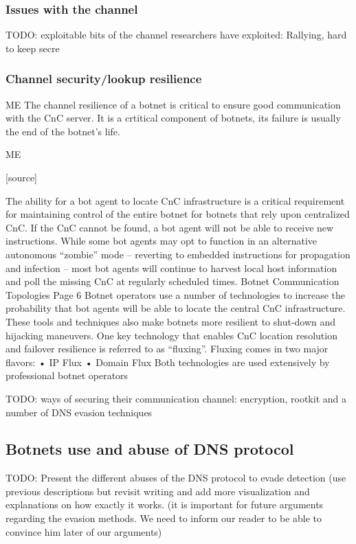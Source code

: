 \subsubsection{Issues with the channel}
TODO: exploitable bits of the channel researchers have exploited: Rallying, hard to keep secre

\subsubsection{Channel security/lookup resilience}
ME
The channel resilience of a botnet is critical to ensure good communication with the CnC server. It is a crtitical component of botnets, its failure is usually the end of the botnet's life. 



ME


[source]

The ability for a bot agent to locate CnC infrastructure is a critical requirement for
maintaining control of the entire botnet for botnets that rely upon centralized CnC. If
the CnC cannot be found, a bot agent will not be able to receive new instructions.
While some bot agents may opt to function in an alternative autonomous “zombie”
mode – reverting to embedded instructions for propagation and infection – most bot
agents will continue to harvest local host information and poll the missing CnC at
regularly scheduled times.
Botnet Communication Topologies
Page 6
Botnet operators use a number of technologies to increase the probability that bot
agents will be able to locate the central CnC infrastructure. These tools and techniques
also make botnets more resilient to shut-down and hijacking maneuvers.
One key technology that enables CnC location resolution and failover resilience is
referred to as “fluxing”. Fluxing comes in two major flavors:
• IP Flux
• Domain Flux
Both technologies are used extensively by professional botnet operators


TODO: ways of securing their communication channel: encryption, rootkit and a number of DNS evasion techniques
\subsection{Botnets use and abuse of DNS protocol}
TODO: Present the different abuses of the DNS protocol to evade detection
(use previous descriptions but revisit writing and add more visualization and explanations on how exactly it works. (it is important for future arguments regarding the evasion methods. We need to inform our reader to be able to convince him later of our arguments)
